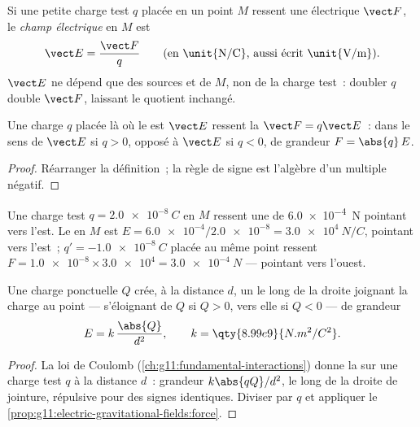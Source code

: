 \begin{definition}\label{def:g11:electric-gravitational-fields:efield}
Si une petite charge test $q$ placée en un point $M$ ressent une
 électrique $\vect F$, le \emph{champ
électrique} en $M$ est
\[
\vect E = \frac{\vect F}{q}
\qquad \text{(en \unit{N/C}, aussi écrit \unit{V/m})}.
\]
$\vect E$ ne dépend que des sources et de $M$, non de la charge test~:
doubler $q$ double $\vect F$, laissant le quotient inchangé.
\end{definition}

\begin{proposition}\label{prop:g11:electric-gravitational-fields:force}
Une charge $q$ placée là où le
 est $\vect E$ ressent la
 $\vect F = q \vect E$~: dans le sens
de $\vect E$ si $q > 0$, opposé à $\vect E$ si $q < 0$, de grandeur
$F = \abs{q}\,E$.
\end{proposition}

\begin{proof}
Réarranger la définition~; la règle de signe est l'algèbre d'un multiple
négatif.
\end{proof}

\begin{example}\label{ex:g11:electric-gravitational-fields:reading}
Une charge test $q = \qty{+2.0e-8}{C}$ en $M$ ressent une
 de \qty{6.0e-4}{N} pointant vers l'est.
Le  en $M$ est
$E = \num{6.0e-4} / \num{2.0e-8} = \qty{3.0e4}{N/C}$, pointant vers
l'est~; $q' = \qty{-1.0e-8}{C}$ placée au même point ressent
$F = \num{1.0e-8} \times \num{3.0e4} = \qty{3.0e-4}{N}$ --- pointant
vers l'ouest.
\end{example}

\begin{proposition}\label{prop:g11:electric-gravitational-fields:point}
Une charge ponctuelle $Q$ crée, à la distance $d$, un
 le long de la droite joignant
la charge au point --- s'éloignant de $Q$ si $Q > 0$, vers elle si
$Q < 0$ --- de grandeur
\[
E = k\,\frac{\abs{Q}}{d^2},
\qquad k = \qty{8.99e9}{N.m^2/C^2}.
\]
\end{proposition}

\begin{proof}
La loi de Coulomb (\cref{ch:g11:fundamental-interactions}) donne la
 sur une charge test $q$ à la distance
$d$~: grandeur $k \abs{qQ} / d^2$, le long de la droite de jointure,
répulsive pour des signes identiques. Diviser par $q$ et appliquer le
\cref{prop:g11:electric-gravitational-fields:force}.
\end{proof}

